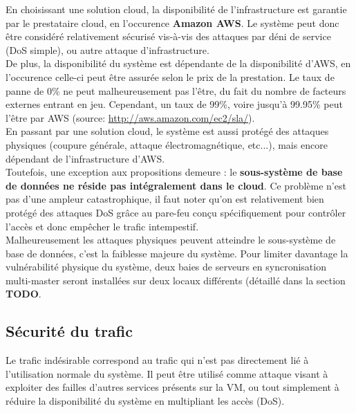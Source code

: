En choisissant une solution cloud, la disponibilité de l'infrastructure est
garantie par le prestataire cloud, en l'occurence \textbf{Amazon AWS}. Le
système peut donc être considéré relativement sécurisé vis-à-vis des attaques
par déni de service (DoS simple), ou autre attaque d'infrastructure. \\

De plus, la disponibilité du système est dépendante de la disponibilité d'AWS,
en l'occurence celle-ci peut être assurée selon le prix de la prestation. Le
taux de panne de 0\% ne peut malheureusement pas l'être, du fait du nombre de
facteurs externes entrant en jeu. Cependant, un taux de 99\%, voire jusqu'à
99.95\% peut l'être par AWS (source: \url{http://aws.amazon.com/ec2/sla/}). \\

En passant par une solution cloud, le système est aussi protégé des attaques
physiques (coupure générale, attaque électromagnétique, etc...), mais encore
dépendant de l'infrastructure d'AWS. \\

Toutefois, une exception aux propositions demeure : le \textbf{sous-système de
base de données ne réside pas intégralement dans le cloud}. Ce problème n'est
pas d'une ampleur catastrophique, il faut noter qu'on est relativement bien
protégé des attaques DoS grâce au pare-feu conçu spécifiquement pour contrôler
l'accès et donc empêcher le trafic intempestif. \\

Malheureusement les attaques physiques peuvent atteindre le sous-système de
base de données, c'est la faiblesse majeure du système. Pour limiter davantage
la vulnérabilité physique du système, deux baies de serveurs en syncronisation
multi-master seront installées sur deux locaux différents (détaillé dans la
section {\huge \textbf{TODO}}.

\subsection{Sécurité du trafic}
\label{subsec:securite-trafic}

Le trafic indésirable correspond au trafic qui n'est pas directement lié à
l'utilisation normale du système. Il peut être utilisé comme attaque visant à 
exploiter des failles d'autres services présents sur la VM, ou tout
simplement à réduire la disponibilité du système en multipliant les
accès (DoS). \\


